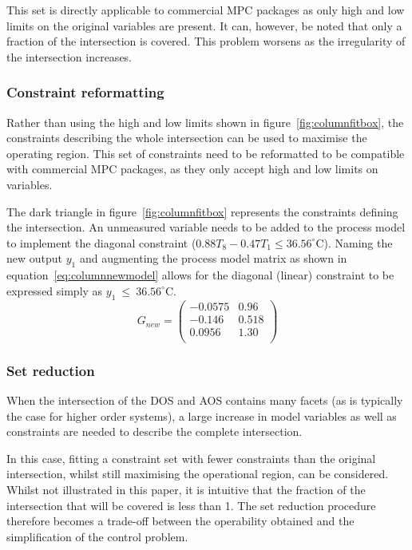 \documentclass[final,authoryear,5pt,times,twocolumn]{elsarticle}
\newcommand{\degrees}[1]{^{\circ}\text{{#1}}} %
\newcommand{\bpm}{\begin{pmatrix}} %
\newcommand{\epm}{\end{pmatrix}}
\begin{document}
This set is directly applicable to commercial MPC packages as only high and low limits on the original variables are present.
It can, however, be noted that only a fraction of the intersection is covered.
This problem worsens as the irregularity of the intersection increases.

\subsubsection{Constraint reformatting}
Rather than using the high and low limits shown in figure~\ref{fig:columnfitbox}, the constraints describing the whole intersection can be used to maximise the operating region.
This set of constraints need to be reformatted to be compatible with commercial MPC packages, as they only accept high and low limits on variables.

The dark triangle in figure~\ref{fig:columnfitbox} represents the constraints defining the intersection.
An unmeasured variable needs to be added to the process model to implement the diagonal constraint ($0.88T_8-0.47T_1\leq 36.56\degrees{C}$).
Naming the new output $y_1$ and augmenting the process model matrix as shown in equation~\ref{eq:columnnewmodel} allows for the diagonal (linear) constraint to be expressed simply as {$y_1~\leq~36.56\degrees{C}$}.
\begin{equation}
  \label{eq:columnnewmodel}
  G_{new}= \bpm -0.0575 & 0.96 \\       %
                  -0.146  & 0.518 \\      %
                   0.0956 & 1.30 \\ \epm  %
\end{equation}

\subsubsection{Set reduction}
When the intersection of the DOS and AOS contains many facets (as is typically the case for higher order systems), a large increase in model variables as well as constraints are needed to describe the complete intersection.

In this case, fitting a constraint set with fewer constraints than the original intersection, whilst still maximising the operational region, can be considered.
Whilst not illustrated in this paper, it is intuitive that the fraction of the intersection that will be covered is less than 1.
The set reduction procedure therefore becomes a trade-off between the operability obtained and the simplification of the control problem.
\end{document}
